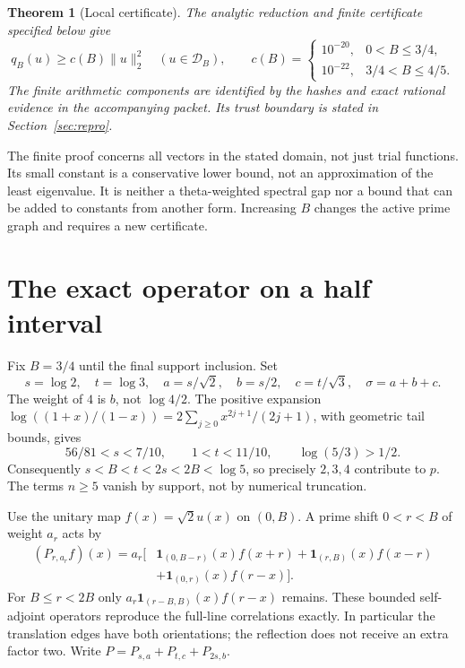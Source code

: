 \documentclass[11pt]{article}
\newtheorem{theorem}{Theorem}
\newcommand{\norm}[1]{\lVert#1\rVert}
\begin{document}
\begin{theorem}[Local certificate]\label{thm:main}
The analytic reduction and finite certificate specified below give
\[
 q_B(u)\ge c(B)\norm u_2^2\quad(u\in\mathcal D_B),\qquad
 c(B)=\begin{cases}10^{-20},&0<B\le3/4,\\10^{-22},&3/4<B\le4/5.\end{cases}
\]
The finite arithmetic components are identified by the hashes and exact rational evidence in the accompanying packet. Its trust boundary is stated in Section~\ref{sec:repro}.
\end{theorem}
The finite proof concerns all vectors in the stated domain, not just trial functions. Its small constant is a conservative lower bound, not an approximation of the least eigenvalue. It is neither a theta-weighted spectral gap nor a bound that can be added to constants from another form. Increasing $B$ changes the active prime graph and requires a new certificate.

\section{The exact operator on a half interval}
Fix $B=3/4$ until the final support inclusion. Set
\[
 s=\log2,\quad t=\log3,\quad
 a=s/\sqrt2,\quad b=s/2,\quad c=t/\sqrt3,\quad \sigma=a+b+c.
\]
The weight of $4$ is $b$, not $\log4/2$. The positive expansion
$\log((1+x)/(1-x))=2\sum_{j\ge0}x^{2j+1}/(2j+1)$, with geometric tail bounds, gives
\[
 56/81<s<7/10,\qquad 1<t<11/10,\qquad \log(5/3)>1/2.
\]
Consequently $s<B<t<2s<2B<\log5$, so precisely $2,3,4$ contribute to $p$. The terms $n\ge5$ vanish by support, not by numerical truncation.

Use the unitary map $f(x)=\sqrt2u(x)$ on $(0,B)$. A prime shift $0<r<B$ of weight $a_r$ acts by
\begin{align}
 (P_{r,a_r}f)(x)=a_r\big[&\mathbf1_{(0,B-r)}(x)f(x+r)
 +\mathbf1_{(r,B)}(x)f(x-r)\nonumber\\
 &+\mathbf1_{(0,r)}(x)f(r-x)\big].\label{eq:shift}
\end{align}
For $B\le r<2B$ only $a_r\mathbf1_{(r-B,B)}(x)f(r-x)$ remains. These bounded self-adjoint operators reproduce the full-line correlations exactly. In particular the translation edges have both orientations; the reflection does not receive an extra factor two. Write $P=P_{s,a}+P_{t,c}+P_{2s,b}$.
\end{document}
